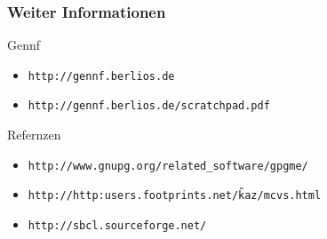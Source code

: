 \documentclass[german]{beamer}
\begin{document}
\begin{frame}
  \frametitle{Weiter Informationen}
  \begin{block}{Gennf}
    \begin{itemize}
    \item \tt{http://gennf.berlios.de}
    \item \tt{http://gennf.berlios.de/scratchpad.pdf}
    \end{itemize}
  \end{block}
  \begin{block}{Refernzen}
    \begin{itemize}
    \item \tt{http://www.gnupg.org/related\_software/gpgme/}
    \item \tt{http://http:users.footprints.net/\~kaz/mcvs.html}
    \item \tt{http://sbcl.sourceforge.net/}
    \end{itemize}
  \end{block}
\end{frame}
\end{document}
